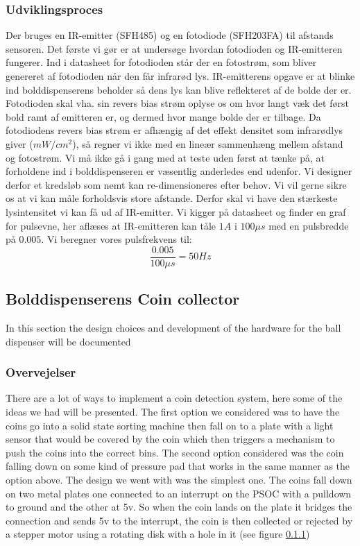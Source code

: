 \documentclass[HardwareDesign/HardwareDesign_main.tex]{subfiles}
\begin{document}
\subsubsection{Udviklingsproces}
Der bruges en IR-emitter (SFH485) og en fotodiode (SFH203FA) til afstands sensoren. Det første vi gør er at undersøge hvordan fotodioden og IR-emitteren fungerer. Ind i datasheet for fotodioden står der en fotostrøm, som bliver genereret af fotodioden når den får infrarød lys. IR-emitterens opgave er at blinke ind bolddispenserens beholder så dens lys kan blive reflekteret af de bolde der er. Fotodioden skal vha. sin revers bias strøm oplyse os om hvor langt væk det først bold ramt af emitteren er, og dermed hvor mange bolde der er tilbage. Da fotodiodens revers bias strøm er afhængig af det effekt densitet som infrarødlys giver ($mW/cm^2$), så regner vi ikke med en lineær sammenhæng mellem afstand og fotostrøm.
Vi må ikke gå i gang med at teste uden først at tænke på, at forholdene ind i bolddispenseren er væsentlig anderledes end udenfor. Vi designer derfor et kredsløb som nemt kan re-dimensioneres efter behov. Vi vil gerne sikre os at vi kan måle forholdsvis store afstande. Derfor skal vi have den stærkeste lysintensitet vi kan få ud af IR-emitter. Vi kigger på datasheet og finder en graf for pulsevne, her aflæses at IR-emitteren kan tåle $1A$ i $100\mu s$ med en pulsbredde på $0.005$. Vi beregner vores pulsfrekvens til:
\[\frac{0.005}{100\mu s}=50Hz\]


\subsection{Bolddispenserens Coin collector}\label{subsec:bolddispenserensCoinCollector}
In this section the design choices and development of the hardware for the ball dispenser will be documented
\subsubsection{Overvejelser}
There are a lot of ways to implement a coin detection system, here some of the ideas we had will be presented.
The first option we considered was to have the coins go into a solid state sorting machine then fall on to a plate with a light sensor that would be covered by the coin which then triggers a mechanism to push the coins into the correct bins.
The second option considered was the coin falling down on some kind of pressure pad that works in the same manner as the option above.
The design we went with was the simplest one.
The coins fall down on two metal plates one connected to an interrupt on the PSOC with a pulldown to ground and the other at 5v.
So when the coin lands on the plate it bridges the connection and sends 5v to the interrupt, the coin is then collected or rejected by a stepper motor using a rotating disk with a hole in it (see figure \ref{})
\end{document}
